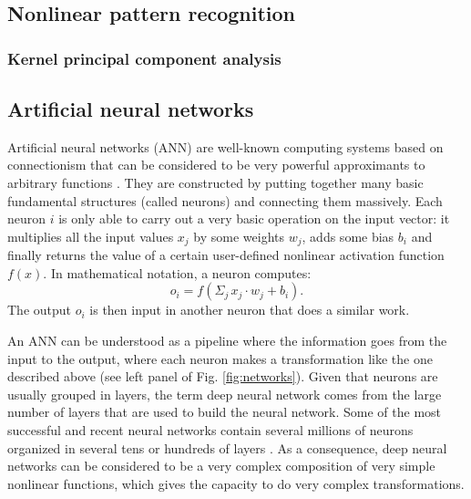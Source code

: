 \subsection{Nonlinear pattern recognition}
\subsubsection{Kernel principal component analysis}

\subsection{Artificial neural networks}
Artificial neural networks (ANN) are well-known computing systems based on connectionism
that can be considered to be very powerful approximants to arbitrary functions \citep{B96}.
They are constructed by putting together many basic fundamental structures (called neurons)
and connecting them massively. Each neuron $i$ is only able to carry out a very basic operation
on the input vector: it multiplies all the input values $x_j$ by some weights $w_j$, 
adds some bias $b_i$ and finally returns the value of a certain user-defined
nonlinear activation function $f(x)$. In mathematical notation, a neuron computes:
\begin{equation}
o_i = f(\Sigma_j\,x_j\cdot w_j + b_i).
\end{equation}
The output $o_i$ is then input in another neuron that does a similar work.
 
An ANN can be understood as a pipeline where the information goes from the input to the output, 
where each neuron makes a transformation like the one described above (see left panel of Fig. 
\ref{fig:networks}). Given that neurons are usually grouped in layers, the term deep neural network 
comes from the large number of layers that are used to build the neural network. Some of 
the most successful and recent neural networks contain several millions of neurons organized in
several tens or hundreds of layers \cite{veryDeep2014}. As a consequence, deep neural networks can 
be considered to be a very complex composition of very simple nonlinear functions, which gives 
the capacity to do very complex transformations.

